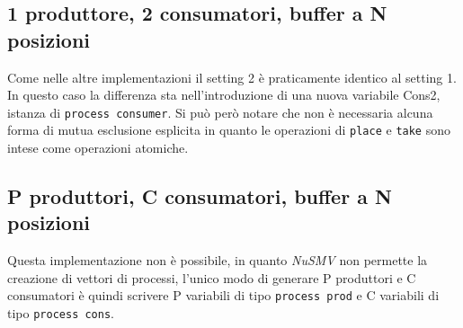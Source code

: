 \documentclass[a4paper]{article}
\begin{document}
\subsection{1 produttore, 2 consumatori, buffer a N posizioni}

Come nelle altre implementazioni il setting 2 è praticamente identico al setting 1. In questo caso la differenza sta nell'introduzione di una nuova variabile Cons2, istanza di \texttt{process consumer}.
Si può però notare che non è necessaria alcuna forma di mutua esclusione esplicita in quanto le operazioni di \texttt{place} e \texttt{take} sono intese come operazioni atomiche.
\subsection{P produttori, C consumatori, buffer a N posizioni}
Questa implementazione non è possibile, in quanto \emph{NuSMV} non permette la creazione di vettori di processi, l'unico modo di generare P produttori e C consumatori è quindi scrivere P variabili di tipo \texttt{process prod} e C variabili di tipo \texttt{process cons}.
\end{document}
